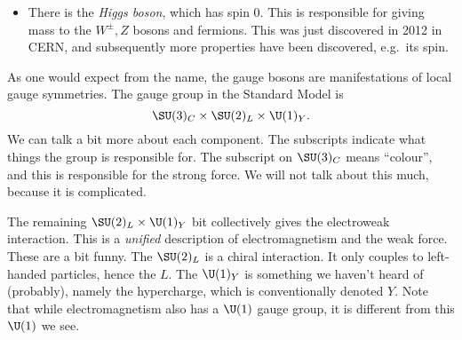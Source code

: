 \documentclass[a4paper]{article}
\begin{document}
\begin{itemize}
  \item There is the \emph{Higgs boson}, which has spin 0. This is responsible for giving mass to the $W^{\pm}, Z$ bosons and fermions. This was just discovered in 2012 in CERN, and subsequently more properties have been discovered, e.g.\ its spin.
\end{itemize}

As one would expect from the name, the gauge bosons are manifestations of local gauge symmetries. The gauge group in the Standard Model is
\[
  \SU(3)_C \times \SU(2)_L \times \U(1)_Y.
\]
We can talk a bit more about each component. The subscripts indicate what things the group is responsible for. The subscript on $\SU(3)_C$ means ``colour'', and this is responsible for the strong force. We will not talk about this much, because it is complicated.

The remaining $\SU(2)_L \times \U(1)_Y$ bit collectively gives the electroweak interaction. This is a \emph{unified} description of electromagnetism and the weak force. These are a bit funny. The $\SU(2)_L$ is a chiral interaction. It only couples to left-handed particles, hence the $L$. The $\U(1)_Y$ is something we haven't heard of (probably), namely the hypercharge, which is conventionally denoted $Y$. Note that while electromagnetism also has a $\U(1)$ gauge group, it is different from this $\U(1)$ we see.
\end{document}
